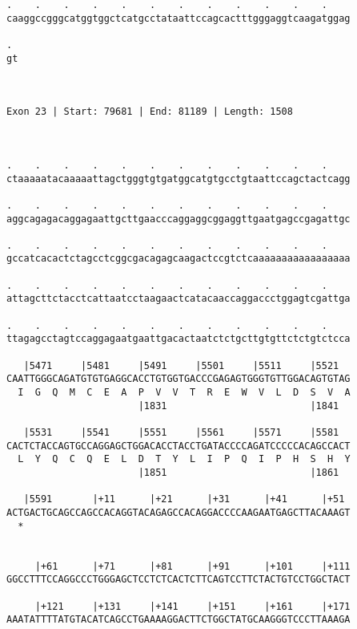 \documentclass{article}
\begin{document}
\begin{Verbatim}
.    .    .    .    .    .    .    .    .    .    .    .    
caaggccgggcatggtggctcatgcctataattccagcactttgggaggtcaagatggag
                                                            
. 
gt
  
  
 
Exon 23 | Start: 79681 | End: 81189 | Length: 1508



.    .    .    .    .    .    .    .    .    .    .    .    
ctaaaaatacaaaaattagctgggtgtgatggcatgtgcctgtaattccagctactcagg
                                                            
.    .    .    .    .    .    .    .    .    .    .    .    
aggcagagacaggagaattgcttgaacccaggaggcggaggttgaatgagccgagattgc
                                                            
.    .    .    .    .    .    .    .    .    .    .    .    
gccatcacactctagcctcggcgacagagcaagactccgtctcaaaaaaaaaaaaaaaaa
                                                            
.    .    .    .    .    .    .    .    .    .    .    .    
attagcttctacctcattaatcctaagaactcatacaaccaggaccctggagtcgattga
                                                            
.    .    .    .    .    .    .    .    .    .    .    .    
ttagagcctagtccaggagaatgaattgacactaatctctgcttgtgttctctgtctcca
                                                            
   |5471     |5481     |5491     |5501     |5511     |5521  
CAATTGGGCAGATGTGTGAGGCACCTGTGGTGACCCGAGAGTGGGTGTTGGACAGTGTAG
  I  G  Q  M  C  E  A  P  V  V  T  R  E  W  V  L  D  S  V  A
                       |1831                         |1841  
  
   |5531     |5541     |5551     |5561     |5571     |5581  
CACTCTACCAGTGCCAGGAGCTGGACACCTACCTGATACCCCAGATCCCCCACAGCCACT
  L  Y  Q  C  Q  E  L  D  T  Y  L  I  P  Q  I  P  H  S  H  Y
                       |1851                         |1861  
  
   |5591       |+11      |+21      |+31      |+41      |+51 
ACTGACTGCAGCCAGCCACAGGTACAGAGCCACAGGACCCCAAGAATGAGCTTACAAAGT
  *   
                                                            
  
     |+61      |+71      |+81      |+91      |+101     |+111
GGCCTTTCCAGGCCCTGGGAGCTCCTCTCACTCTTCAGTCCTTCTACTGTCCTGGCTACT
                                                            
     |+121     |+131     |+141     |+151     |+161     |+171
AAATATTTTATGTACATCAGCCTGAAAAGGACTTCTGGCTATGCAAGGGTCCCTTAAAGA
                                                            

\end{Verbatim}
\end{document}
